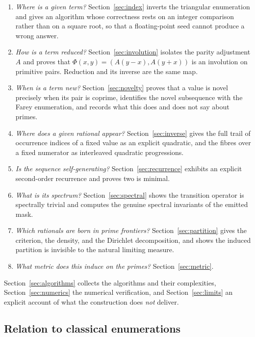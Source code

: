 \documentclass[11pt,a4paper]{article}
\theoremstyle{plain}
\theoremstyle{definition}
\theoremstyle{remark}
\begin{document}
\begin{enumerate}
  \item \emph{Where is a given term?} Section~\ref{sec:index} inverts the
    triangular enumeration and gives an algorithm whose correctness rests on an
    integer comparison rather than on a square root, so that a floating-point
    seed cannot produce a wrong answer.
  \item \emph{How is a term reduced?} Section~\ref{sec:involution} isolates the
    parity adjustment $A$ and proves that $\Phi(x,y) = (A(y-x), A(y+x))$ is an
    involution on primitive pairs. Reduction and its inverse are the same map.
  \item \emph{When is a term new?} Section~\ref{sec:novelty} proves that a value
    is novel precisely when its pair is coprime, identifies the novel
    subsequence with the Farey enumeration, and records what this does and does
    not say about primes.
  \item \emph{Where does a given rational appear?} Section~\ref{sec:inverse}
    gives the full trail of occurrence indices of a fixed value as an explicit
    quadratic, and the fibres over a fixed numerator as interleaved quadratic
    progressions.
  \item \emph{Is the sequence self-generating?} Section~\ref{sec:recurrence}
    exhibits an explicit second-order recurrence and proves two is minimal.
  \item \emph{What is its spectrum?} Section~\ref{sec:spectral} shows the
    transition operator is spectrally trivial and computes the genuine spectral
    invariants of the emitted mask.
  \item \emph{Which rationals are born in prime frontiers?}
    Section~\ref{sec:partition} gives the criterion, the density, and the
    Dirichlet decomposition, and shows the induced partition is invisible to the
    natural limiting measure.
  \item \emph{What metric does this induce on the primes?}
    Section~\ref{sec:metric}.
\end{enumerate}

Section~\ref{sec:algorithms} collects the algorithms and their complexities,
Section~\ref{sec:numerics} the numerical verification, and
Section~\ref{sec:limits} an explicit account of what the construction does
\emph{not} deliver.

\subsection{Relation to classical enumerations}
\label{sec:classical}
\end{document}
